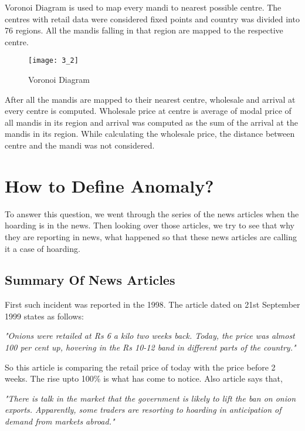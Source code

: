 Voronoi Diagram is used to map every mandi to nearest possible centre. The centres with retail data were considered fixed points and country was divided into 76 regions. All the mandis falling in that region are mapped to the respective centre.


\begin{figure}[h]
\begin{center}    
\texttt{[image: 3\_2]}
\caption{Voronoi Diagram}
\label{fig:Voronoi Diagram}
\end{center}
\end{figure}


After all the mandis are mapped to their nearest centre, wholesale and arrival at every centre is computed. Wholesale price at centre is average of modal price of all mandis in its region and arrival was computed as the sum of the arrival at the mandis in its region. While calculating the wholesale price, the distance between centre and the mandi was not considered.




\section{How to Define Anomaly?}

To answer this question, we went through the series of the news articles when the hoarding is in the news. Then looking over those articles, we try to see that why they are reporting in news, what happened so that these news articles are calling it a case of hoarding.

\subsection{Summary Of News Articles}


First such incident was reported in the 1998. The article \cite{Redif57:online} dated on 21st September 1999 states as follows:

\textit{"Onions were retailed at Rs 6 a kilo two weeks back. Today, the price was almost 100 per cent up, hovering in the Rs 10-12 band in different parts of the country."}

So this article is comparing the retail price of today with the price before 2 weeks. The rise upto 100\% is what has come to notice. Also article says that,

\textit{"There is talk in the market that the government is likely to lift the ban on onion exports. Apparently, some traders are resorting to hoarding in anticipation of demand from markets abroad."}

